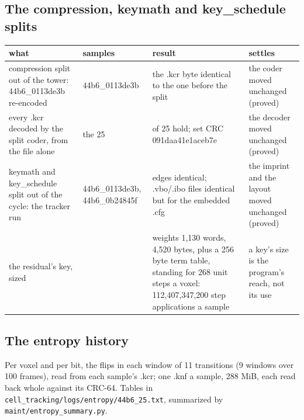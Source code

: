 \subsection{\texorpdfstring{The compression, keymath and key\_\allowbreak{}schedule splits}{The compression, keymath and key\_schedule splits}}

{\footnotesize
\setlength{\tabcolsep}{6pt}
\begin{longtable}{>{\RaggedRight\arraybackslash}p{}>{\RaggedRight\arraybackslash}p{}>{\RaggedRight\arraybackslash}p{}>{\RaggedRight\arraybackslash}p{}}
\toprule
what & samples & result & settles \\
\midrule
\endhead
compression split out of the tower: 44b6\_\allowbreak{}0113de3b re-encoded & 44b6\_\allowbreak{}0113de3b & the .kcr byte identical to the one before the split & the coder moved unchanged (proved) \\
every .kcr decoded by the split coder, from the file alone & the 25 & 25 of 25 hold; set CRC 091daa41e1aceb7e & the decoder moved unchanged (proved) \\
keymath and key\_\allowbreak{}schedule split out of the cycle: the tracker run & 44b6\_\allowbreak{}0113de3b, 44b6\_\allowbreak{}0b24845f & edges identical; .vbo/.ibo files identical but for the embedded .cfg & the imprint and the layout moved unchanged (proved) \\
the residual's key, sized &  & weights 1,130 words, 4,520 bytes, plus a 256 byte term table, standing for 268 unit steps a voxel: 112,407,347,200 step applications a sample & a key's size is the program's reach, not its use \\
\bottomrule
\end{longtable}
}

\subsection{\texorpdfstring{The entropy history}{The entropy history}}

Per voxel and per bit, the flips in each window of 11 transitions (9 windows over 100 frames), read from each sample's .kcr; one .knf a sample, 288 MiB, each read back whole against its CRC-64. Tables in \texttt{cell\_\allowbreak{}tracking/\allowbreak{}logs/\allowbreak{}entropy/\allowbreak{}44b6\_\allowbreak{}25.\allowbreak{}txt}, summarized by \texttt{maint/\allowbreak{}entropy\_\allowbreak{}summary.\allowbreak{}py}.

